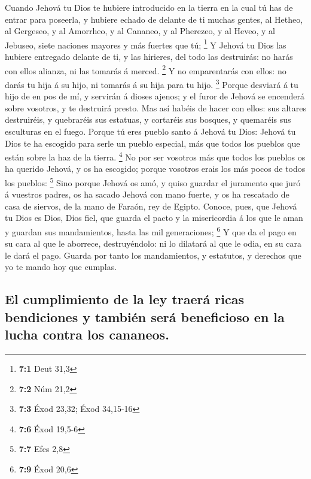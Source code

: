  Cuando Jehová tu Dios te hubiere introducido en la tierra
en la cual tú has de entrar para poseerla, y hubiere echado de delante
de ti muchas gentes, al Hetheo, al Gergeseo, y al Amorrheo, y al
Cananeo, y al Pherezeo, y al Heveo, y al Jebuseo, siete naciones mayores
y más fuertes que tú; \footnote{\textbf{7:1} Deut 31,3}  Y
Jehová tu Dios las hubiere entregado delante de ti, y las hirieres, del
todo las destruirás: no harás con ellos alianza, ni las tomarás á
merced. \footnote{\textbf{7:2} Núm 21,2}  Y no
emparentarás con ellos: no darás tu hija á su hijo, ni tomarás á su hija
para tu hijo. \footnote{\textbf{7:3} Éxod 23,32; Éxod 34,15-16}
 Porque desviará á tu hijo de en pos de mí, y servirán á
dioses ajenos; y el furor de Jehová se encenderá sobre vosotros, y te
destruirá presto.  Mas así habéis de hacer con ellos: sus
altares destruiréis, y quebraréis sus estatuas, y cortaréis sus bosques,
y quemaréis sus esculturas en el fuego.  Porque tú eres
pueblo santo á Jehová tu Dios: Jehová tu Dios te ha escogido para serle
un pueblo especial, más que todos los pueblos que están sobre la haz de
la tierra. \footnote{\textbf{7:6} Éxod 19,5-6}  No por ser
vosotros más que todos los pueblos os ha querido Jehová, y os ha
escogido; porque vosotros erais los más pocos de todos los pueblos:
\footnote{\textbf{7:7} Efes 2,8}  Sino porque Jehová os
amó, y quiso guardar el juramento que juró á vuestros padres, os ha
sacado Jehová con mano fuerte, y os ha rescatado de casa de siervos, de
la mano de Faraón, rey de Egipto.  Conoce, pues, que
Jehová tu Dios es Dios, Dios fiel, que guarda el pacto y la misericordia
á los que le aman y guardan sus mandamientos, hasta las mil
generaciones; \footnote{\textbf{7:9} Éxod 20,6}  Y que da
el pago en su cara al que le aborrece, destruyéndolo: ni lo dilatará al
que le odia, en su cara le dará el pago.  Guarda por
tanto los mandamientos, y estatutos, y derechos que yo te mando hoy que
cumplas.

\hypertarget{el-cumplimiento-de-la-ley-traeruxe1-ricas-bendiciones-y-tambiuxe9n-seruxe1-beneficioso-en-la-lucha-contra-los-cananeos.}{%
\subsection{El cumplimiento de la ley traerá ricas bendiciones y también
será beneficioso en la lucha contra los
cananeos.}\label{el-cumplimiento-de-la-ley-traeruxe1-ricas-bendiciones-y-tambiuxe9n-seruxe1-beneficioso-en-la-lucha-contra-los-cananeos.}}

